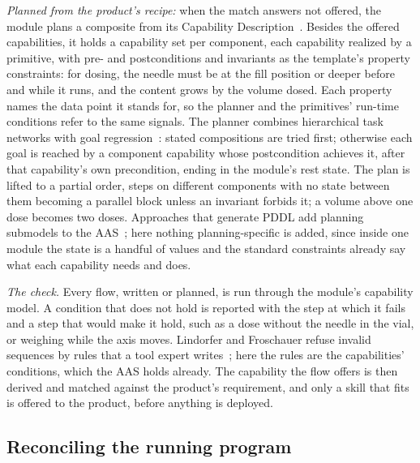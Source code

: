 \emph{Planned from the product's recipe:} when the match answers not offered, the module plans a
composite from its Capability Description~\cite{idta02020}. Besides the offered capabilities, it holds a
capability set per component, each capability realized by a primitive, with pre- and postconditions and
invariants as the template's property constraints: for dosing, the needle must be at the fill position
or deeper before and while it runs, and the content grows by the volume dosed. Each property names the
data point it stands for, so the planner and the primitives' run-time conditions refer to the same
signals. The planner combines hierarchical task networks with goal regression~\cite{nau2021gtpyhop}:
stated compositions are tried first; otherwise each goal is reached by a component capability whose
postcondition achieves it, after that capability's own precondition, ending in the module's rest
state. The plan is lifted to a partial order, steps on different components with no state between
them becoming a parallel block unless an invariant forbids it; a volume above one dose becomes two
doses. Approaches that generate PDDL add planning submodels to the AAS~\cite{nabizada2026capability};
here nothing planning-specific is added, since inside one module the state is a handful of values and
the standard constraints already say what each capability needs and does.

\emph{The check.} Every flow, written or planned, is run through the module's capability model. A
condition that does not hold is reported with the step at which it fails and a step that would make it
hold, such as a dose without the needle in the vial, or weighing while the axis moves. Lindorfer and
Froschauer refuse invalid sequences by rules that a tool expert writes~\cite{lindorfer2019user}; here
the rules are the capabilities' conditions, which the AAS holds already. The capability the flow offers
is then derived and matched against the product's requirement, and only a skill that fits is offered to
the product, before anything is deployed.

\subsection{Reconciling the running program}
\label{sec:reconcile}


